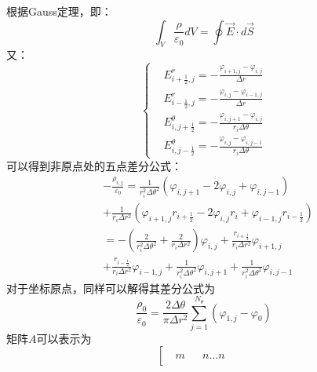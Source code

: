 \documentclass[twoside,twocolumn]{article}
\begin{document}
\begin{CJK*}{UTF8}{gkai}
	根据Gauss定理，即：
	\begin{equation*}
	\int_{V}\frac{\rho}{\varepsilon_{0}}dV=\oint\vec{E}\cdot d\vec{S}
	\end{equation*}
	又：
	\begin{equation*}
	\left\{
	\begin{aligned}
	&E_{i+\frac{1}{2},j}^{r}=-\frac{\varphi_{i+1,j}-\varphi_{i,j}}{\Delta r}\\
	&E_{i-\frac{1}{2},j}^{r}=-\frac{\varphi_{i,j}-\varphi_{i-1,j}}{\Delta r}\\
	&E_{i,j+\frac{1}{2}}^{\theta}=-\frac{\varphi_{i,j+1}-\varphi_{i,j}}{r_{i}\Delta \theta}\\
	&E_{i,j-\frac{1}{2}}^{\theta}=-\frac{\varphi_{i,j}-\varphi_{i,j-1}}{r_{i}\Delta \theta}
	\end{aligned}\right.
	\end{equation*}
	可以得到非原点处的五点差分公式：
	\begin{equation*}
	\begin{aligned}
	&-\frac{\rho_{i,j}}{\varepsilon_{0}}=\frac{1}{r_{i}^{2}\Delta\theta^{2}}(\varphi_{i,j+1}-2\varphi_{i,j}+\varphi_{i,j-1})\\
	&+\frac{1}{r_{i}\Delta r^{2}}\left(\varphi_{i+1,j}r_{i+\frac{1}{2}}-2\varphi_{i,j}r_{i}+\varphi_{i-1,j}r_{i-\frac{1}{2}}\right)\\
	&=-\left(\frac{2}{r_{i}^{2}\Delta\theta^{2}}+\frac{2}{r_{i}\Delta r^{2}}\right)\varphi_{i,j}+\frac{r_{i+\frac{1}{2}}}{r_{i}\Delta r^{2}}\varphi_{i+1,j}\\
	&+\frac{r_{i-\frac{1}{2}}}{r_{i}\Delta r^{2}}\varphi_{i-1,j}+\frac{1}{r_{i}^{2}\Delta \theta^{2}}\varphi_{i,j+1}+\frac{1}{r_{i}^{2}\Delta\theta^{2}}\varphi_{i,j-1}
	\end{aligned}
	\end{equation*}
	对于坐标原点，同样可以解得其差分公式为
	\begin{equation*}
	\frac{\rho_{0}}{\varepsilon_{0}}=\frac{2\Delta \theta}{\pi\Delta r^{2}}\sum_{j=1}^{N_{\theta}}(\varphi_{1,j}-\varphi_{0})
	\end{equation*}
	矩阵$A$可以表示为
	\setlength{\arraycolsep}{3pt} 
		\begin{equation*}
		\left[~
		\begin{array}{c|c|c|c}
		\begin{matrix}
		m
		\end{matrix}&
		\begin{matrix}
		n \ldots n
		\end{matrix} &
		\begin{matrix}

\end{matrix}
\end{array}
\end{equation*}
\end{CJK*}
\end{document}
